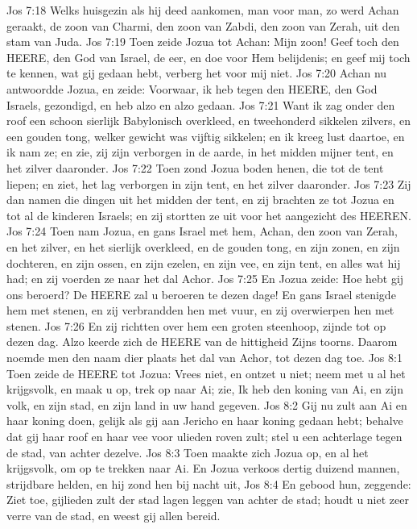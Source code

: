 Jos 7:18  Welks huisgezin als hij deed aankomen, man voor man, zo werd Achan geraakt, de zoon van Charmi, den zoon van Zabdi, den zoon van Zerah, uit den stam van Juda.
Jos 7:19  Toen zeide Jozua tot Achan: Mijn zoon! Geef toch den HEERE, den God van Israel, de eer, en doe voor Hem belijdenis; en geef mij toch te kennen, wat gij gedaan hebt, verberg het voor mij niet.
Jos 7:20  Achan nu antwoordde Jozua, en zeide: Voorwaar, ik heb tegen den HEERE, den God Israels, gezondigd, en heb alzo en alzo gedaan.
Jos 7:21  Want ik zag onder den roof een schoon sierlijk Babylonisch overkleed, en tweehonderd sikkelen zilvers, en een gouden tong, welker gewicht was vijftig sikkelen; en ik kreeg lust daartoe, en ik nam ze; en zie, zij zijn verborgen in de aarde, in het midden mijner tent, en het zilver daaronder.
Jos 7:22  Toen zond Jozua boden henen, die tot de tent liepen; en ziet, het lag verborgen in zijn tent, en het zilver daaronder.
Jos 7:23  Zij dan namen die dingen uit het midden der tent, en zij brachten ze tot Jozua en tot al de kinderen Israels; en zij stortten ze uit voor het aangezicht des HEEREN.
Jos 7:24  Toen nam Jozua, en gans Israel met hem, Achan, den zoon van Zerah, en het zilver, en het sierlijk overkleed, en de gouden tong, en zijn zonen, en zijn dochteren, en zijn ossen, en zijn ezelen, en zijn vee, en zijn tent, en alles wat hij had; en zij voerden ze naar het dal Achor.
Jos 7:25  En Jozua zeide: Hoe hebt gij ons beroerd? De HEERE zal u beroeren te dezen dage! En gans Israel stenigde hem met stenen, en zij verbrandden hen met vuur, en zij overwierpen hen met stenen.
Jos 7:26  En zij richtten over hem een groten steenhoop, zijnde tot op dezen dag. Alzo keerde zich de HEERE van de hittigheid Zijns toorns. Daarom noemde men den naam dier plaats het dal van Achor, tot dezen dag toe.
Jos 8:1  Toen zeide de HEERE tot Jozua: Vrees niet, en ontzet u niet; neem met u al het krijgsvolk, en maak u op, trek op naar Ai; zie, Ik heb den koning van Ai, en zijn volk, en zijn stad, en zijn land in uw hand gegeven.
Jos 8:2  Gij nu zult aan Ai en haar koning doen, gelijk als gij aan Jericho en haar koning gedaan hebt; behalve dat gij haar roof en haar vee voor ulieden roven zult; stel u een achterlage tegen de stad, van achter dezelve.
Jos 8:3  Toen maakte zich Jozua op, en al het krijgsvolk, om op te trekken naar Ai. En Jozua verkoos dertig duizend mannen, strijdbare helden, en hij zond hen bij nacht uit,
Jos 8:4  En gebood hun, zeggende: Ziet toe, gijlieden zult der stad lagen leggen van achter de stad; houdt u niet zeer verre van de stad, en weest gij allen bereid.
